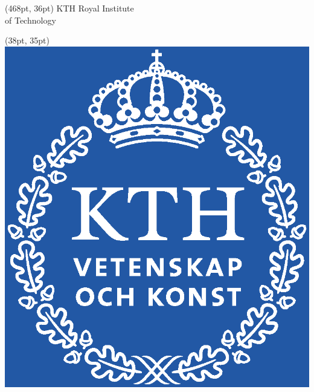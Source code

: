 \makeatletter
\begin{titlepage}
    
    \thispagestyle{empty}
    \begin{textblock*}{120pt}(468pt, 36pt) %
    \colvillebold \small KTH Royal Institute \\of Technology
    \end{textblock*}
    
    \begin{textblock*}{72.85pt}(38pt, 35pt) %
    \includegraphics[width=0.13\paperwidth]{setup/img/kth_logo.eps}
    \end{textblock*}
     

\end{titlepage}
